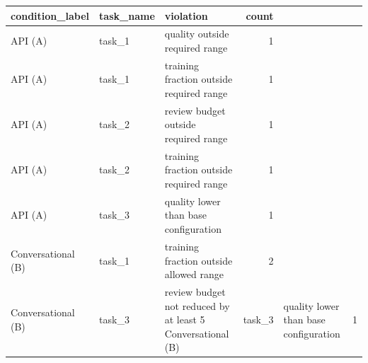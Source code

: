 \begin{tabular}{lllr}
\toprule
   condition_label & task_name &                                violation &  count \\
\midrule
           API (A) &    task_1 &           quality outside required range &      1 \\
           API (A) &    task_1 & training fraction outside required range &      1 \\
           API (A) &    task_2 &     review budget outside required range &      1 \\
           API (A) &    task_2 & training fraction outside required range &      1 \\
           API (A) &    task_3 &    quality lower than base configuration &      1 \\
Conversational (B) &    task_1 &  training fraction outside allowed range &      2 \\
Conversational (B) &    task_3 & review budget not reduced by at least 5%
Conversational (B) &    task_3 &    quality lower than base configuration &      1 \\
\bottomrule
\end{tabular}
